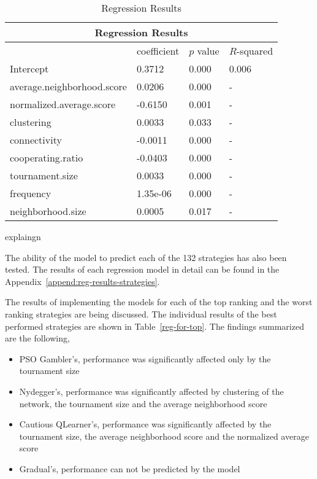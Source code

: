 \begin{table}[!hbtp]
	\centering
	\begin{adjustbox}{width=0.7\textwidth}
		\small
		\begin{tabular}{llll}
			\toprule
			\multicolumn{4}{|c|}{\textbf{Regression Results}}         \\ \hline
			                           & coefficient & \(p\) value & \(R\)-squared \\ \hline
			Intercept                  & 0.3712      & 0.000       & 0.006     \\ \hline
			average.neighborhood.score & 0.0206      & 0.000       & -         \\ \hline
			normalized.average.score   & -0.6150     & 0.001       & -         \\ \hline
			clustering                 & 0.0033      & 0.033       & -         \\ \hline
			connectivity               & -0.0011     & 0.000       & -         \\ \hline
			cooperating.ratio          & -0.0403     & 0.000       & -         \\ \hline
			tournament.size            & 0.0033      & 0.000       & -         \\ \hline
			frequency                  & 1.35e-06    & 0.000       & -         \\ \hline
			neighborhood.size          & 0.0005      & 0.017       & -         \\ \bottomrule

		\end{tabular}
	\end{adjustbox}
	\caption{Regression Results}
	\label{regression-complex-networks}
	explaingn
\end{table}

The ability of the model to predict each of the 132 strategies has also been
tested. The results of each regression model in detail can be found in the
Appendix~\ref{append:reg-results-strategies}.

The results of implementing the models for each of the top ranking and the worst
ranking strategies are being discussed. The individual results of the best
performed strategies are shown in Table~\ref{reg-for-top}. The findings summarized
are the following,

\begin{itemize}
	\item PSO Gambler's, performance was significantly affected only by the tournament size
	\item Nydegger's, performance was significantly affected by clustering of the network,
	      the tournament size and the average neighborhood score
	\item Cautious QLearner's, performance was significantly affected by the tournament size,
	      the average neighborhood score and the normalized average score
	\item Gradual's, performance can not be predicted by the model
\end{itemize}

